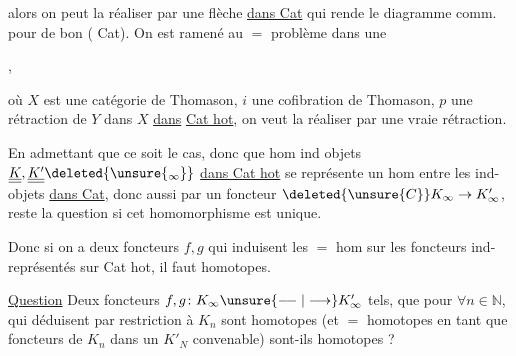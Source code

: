 
alors on peut la réaliser par une flèche \uline{dans Cat} qui rende le diagramme comm. pour de bon ( Cat). On est ramené au $=$ problème dans une 

,

où $X$ est une catégorie de Thomason, $i$ une cofibration de Thomason, $p$ une rétraction de $Y$ dans $X$ \uline{dans} \uline{Cat hot}, on veut la réaliser par une vraie rétraction.


En admettant que ce soit le cas, donc que  hom  ind objets $\underline{\underline K},\underline{\underline {K'}}\deleted{\unsure{{}_{\infty}}}$ \uline{dans Cat hot} se représente  un hom  entre les ind-objets \uline{dans Cat}, donc aussi par un foncteur $\deleted{\unsure{C}}K_\infty\to K'_\infty$, reste la question si cet homomorphisme  est unique. 

Donc si on a deux  foncteurs $f,g$ qui induisent les $=$ hom sur les foncteurs ind-représentés  sur Cat hot, il faut   homotopes.  


\uline{Question} Deux foncteurs $f,g\colon K_\infty\unsure{\relbar\joinrel\relbar|\longrightarrow} K'_\infty$  tels, que pour $\forall n\in\mathbb N$,  qui  déduisent par restriction à $K_n$ sont homotopes  (et $=$ homotopes en tant que foncteurs de $K_n$ dans un $K'_N$ convenable)  sont-ils homotopes ?

